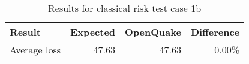\begin{table}[htbp]

\centering
\begin{tabular}{ l r r r }

\hline
\rowcolor{anti-flashwhite}
\bf{Result} & \bf{Expected} & \bf{OpenQuake} & \bf{Difference}\\
\hline
Average loss & 47.63 & 47.63 & 0.00\% \\
\hline
\end{tabular}

\caption{Results for classical risk test case 1b}
\label{tab:result-cr-1b}
\end{table}